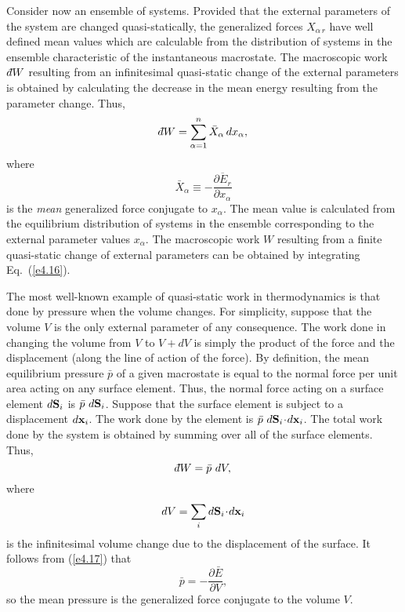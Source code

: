 Consider now an ensemble of systems. Provided that the external
parameters of the system are changed quasi-statically, the generalized forces
$X_{\alpha\,r}$ have well defined mean values which are calculable from the 
distribution of systems in the ensemble characteristic of the instantaneous 
macrostate. 
The macroscopic work $\,\dbar W$ resulting
from an infinitesimal quasi-static change of the external parameters is obtained by
calculating the decrease in the mean energy resulting from the parameter change.
Thus,
\begin{equation}
\dbar W = \sum_{\alpha =1}^n \bar{X}_\alpha\, dx_\alpha,\label{e4.16}
\end{equation}
where
\begin{equation}
\bar{X}_\alpha \equiv -\overline{ \frac{\partial E_r}{\partial x_\alpha}}\label{e4.17}
\end{equation}
is the {\em mean}\/ generalized force conjugate to $x_\alpha$. The mean value is
calculated from the equilibrium distribution of systems in the ensemble corresponding to the external parameter values $x_\alpha$. The macroscopic work $W$ resulting
from a finite quasi-static change of external parameters can be obtained by
integrating Eq.~(\ref{e4.16}).

The most well-known example of quasi-static work in thermodynamics is that done by
pressure when the volume  changes. For simplicity, suppose that the
volume $V$ is the only external parameter of any consequence. The work done in 
changing the volume from $V$ to $V + dV$ is simply the product of the force and
the displacement (along the line of action of the force). By definition, the mean
equilibrium pressure $\bar{p}$ 
 of a given macrostate is equal to the normal force per unit area acting
on any surface element. Thus, the normal force acting on a surface element 
$d{\bf S}_i$ is $\bar{p}\,\,d{\bf S}_i$. Suppose that the surface element is subject
 to a
displacement $d{\bf x}_i$. The work done by the element is $\bar{p}\,\,d{\bf S}_i
\!\cdot\! d{\bf x}_i$. 
The total work done by the system is obtained by summing over all of the surface 
elements. Thus,
\begin{equation}
\dbar W = \bar{p}\, \,dV,
\end{equation}
where
\begin{equation}
dV = \sum_i d{\bf S}_i\!\cdot\! d{\bf x}_i
\end{equation}
is the infinitesimal volume change due to the displacement of the surface.
It follows from (\ref{e4.17}) that
\begin{equation}
\bar{p} = - \frac{ \partial\bar{E} }{\partial V},
\end{equation}
so the mean pressure is the generalized force conjugate to the volume $V$.

